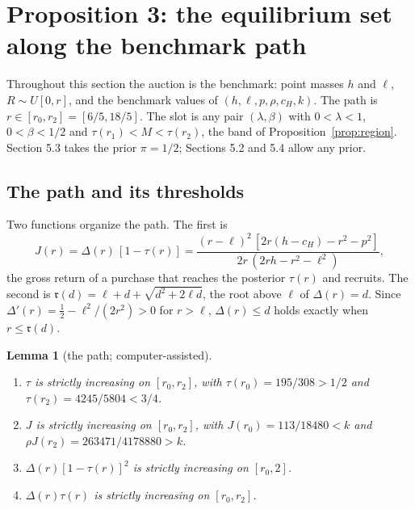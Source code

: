 \documentclass[11pt]{article}
\newtheorem{lemma}{Lemma}
\theoremstyle{definition}
\newcommand{\fr}{\mathfrak r}
\begin{document}
\section{Proposition 3: the equilibrium set along the benchmark path}\label{sec:prop3}

Throughout this section the auction is the benchmark: point masses $h$ and $\ell$, $R\sim U[0,r]$, and the
benchmark values of $(h,\ell,p,\rho,c_H,k)$. The path is $r\in[r_0,r_2]=[6/5,18/5]$. The slot is any pair
$(\lambda,\beta)$ with $0<\lambda<1$, $0<\beta<1/2$ and $\tau(r_1)<M<\tau(r_2)$, the band of
Proposition~\ref{prop:region}. Section 5.3 takes the prior $\pi=1/2$; Sections 5.2 and 5.4 allow any prior.

\subsection{The path and its thresholds}

Two functions organize the path. The first is
\[
J(r)=\Delta(r)\,[1-\tau(r)]=\frac{(r-\ell)^2\,[2r(h-c_H)-r^2-p^2]}{2r\,(2rh-r^2-\ell^2)},
\]
the gross return of a purchase that reaches the posterior $\tau(r)$ and recruits. The second is
$\fr(d)=\ell+d+\sqrt{d^2+2\ell d}$, the root above $\ell$ of $\Delta(r)=d$. Since
$\Delta'(r)=\tfrac12-\ell^2/(2r^2)>0$ for $r>\ell$, $\Delta(r)\le d$ holds exactly when $r\le\fr(d)$.

\begin{lemma}[the path; computer-assisted]\label{lem:path}
\begin{enumerate}[label=(\alph*)]
\item $\tau$ is strictly increasing on $[r_0,r_2]$, with $\tau(r_0)=195/308>1/2$ and $\tau(r_2)=4245/5804<3/4$.
\item $J$ is strictly increasing on $[r_0,r_2]$, with $J(r_0)=113/18480<k$ and $\rho J(r_2)=263471/4178880>k$.
\item $\Delta(r)[1-\tau(r)]^2$ is strictly increasing on $[r_0,2]$.
\item $\Delta(r)\tau(r)$ is strictly increasing on $[r_0,r_2]$.
\end{enumerate}
\end{lemma}
\end{document}
